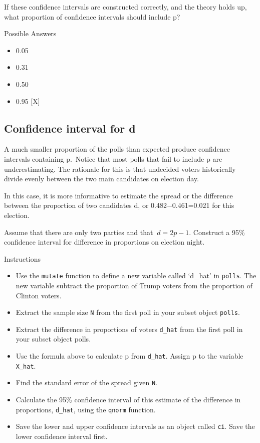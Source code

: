 \documentclass[]{article}
\providecommand{\tightlist}{%
  \setlength{\itemsep}{0pt}\setlength{\parskip}{0pt}}
\begin{document}
If these confidence intervals are constructed correctly, and the theory
holds up, what proportion of confidence intervals should include p?

Possible Answers

\begin{itemize}
\tightlist
\item
  0.05
\item
  0.31
\item
  0.50
\item
  0.95 {[}X{]}
\end{itemize}

\subsection{\texorpdfstring{\textbf{Confidence interval for
d}}{Confidence interval for d}}\label{confidence-interval-for-d}

A much smaller proportion of the polls than expected produce confidence
intervals containing p.~Notice that most polls that fail to include p
are underestimating. The rationale for this is that undecided voters
historically divide evenly between the two main candidates on election
day.

In this case, it is more informative to estimate the spread or the
difference between the proportion of two candidates d, or
0.482−0.461=0.021 for this election.

Assume that there are only two parties and that \(\ d=2p−1\). Construct
a 95\% confidence interval for difference in proportions on election
night.

Instructions

\begin{itemize}
\tightlist
\item
  Use the \texttt{mutate} function to define a new variable called
  `d\_hat' in \texttt{polls}. The new variable subtract the proportion
  of Trump voters from the proportion of Clinton voters.
\item
  Extract the sample size \texttt{N} from the first poll in your subset
  object \texttt{polls}.
\item
  Extract the difference in proportions of voters \texttt{d\_hat} from
  the first poll in your subset object polls.
\item
  Use the formula above to calculate p from \texttt{d\_hat}. Assign p to
  the variable \texttt{X\_hat}.
\item
  Find the standard error of the spread given \texttt{N}.
\item
  Calculate the 95\% confidence interval of this estimate of the
  difference in proportions, \texttt{d\_hat}, using the \texttt{qnorm}
  function.
\item
  Save the lower and upper confidence intervals as an object called
  \texttt{ci}. Save the lower confidence interval first.
\end{itemize}
\end{document}
